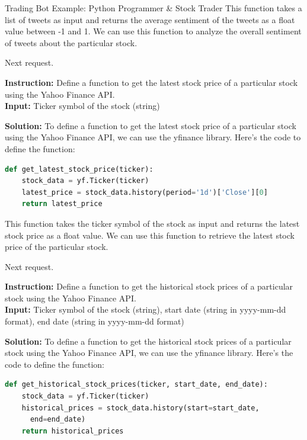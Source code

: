 \begin{AIBoxBreak}{Trading Bot Example: Python Programmer \& Stock Trader}
	This function takes a list of tweets as input and returns the average sentiment of the tweets as a float value between -1 and 1. We can use this function to analyze the overall sentiment of tweets about the particular stock.

	Next request.\\

	\usermsg

	\textbf{Instruction:} Define a function to get the latest stock price of a particular stock using the Yahoo Finance API.\\
	\textbf{Input:} Ticker symbol of the stock (string)\\

	\assistantmsg

	\textbf{Solution:} To define a function to get the latest stock price of a particular stock using the Yahoo Finance API, we can use the yfinance library. Here's the code to define the function:

	\begin{lstlisting}[language=Python]
def get_latest_stock_price(ticker):
    stock_data = yf.Ticker(ticker)
    latest_price = stock_data.history(period='1d')['Close'][0]
    return latest_price
\end{lstlisting}


	This function takes the ticker symbol of the stock as input and returns the latest stock price as a float value. We can use this function to retrieve the latest stock price of the particular stock.

	Next request.\\

	\usermsg

	\textbf{Instruction:} Define a function to get the historical stock prices of a particular stock using the Yahoo Finance API.\\
	\textbf{Input:} Ticker symbol of the stock (string), start date (string in yyyy-mm-dd format), end date (string in yyyy-mm-dd format)\\

	\assistantmsg

	\textbf{Solution:} To define a function to get the historical stock prices of a particular stock using the Yahoo Finance API, we can use the yfinance library. Here's the code to define the function:

	\begin{lstlisting}[language=Python]
def get_historical_stock_prices(ticker, start_date, end_date):
    stock_data = yf.Ticker(ticker)
    historical_prices = stock_data.history(start=start_date,
      end=end_date)
    return historical_prices
\end{lstlisting}


\end{AIBoxBreak}
